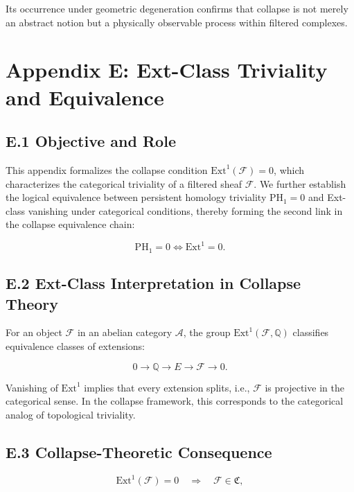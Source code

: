 \documentclass[11pt]{article}
\begin{document}
Its occurrence under geometric degeneration confirms that collapse is not merely an abstract notion but a physically observable process within filtered complexes.



\appendix
\section*{Appendix E: Ext-Class Triviality and Equivalence}

\subsection*{E.1 Objective and Role}

This appendix formalizes the collapse condition \( \mathrm{Ext}^1(\mathcal{F}) = 0 \), which characterizes the categorical triviality of a filtered sheaf \( \mathcal{F} \). We further establish the logical equivalence between persistent homology triviality \( \mathrm{PH}_1 = 0 \) and Ext-class vanishing under categorical conditions, thereby forming the second link in the collapse equivalence chain:

\[
\mathrm{PH}_1 = 0 \iff \mathrm{Ext}^1 = 0.
\]

\subsection*{E.2 Ext-Class Interpretation in Collapse Theory}

For an object \( \mathcal{F} \) in an abelian category \( \mathcal{A} \), the group \( \mathrm{Ext}^1(\mathcal{F}, \mathbb{Q}) \) classifies equivalence classes of extensions:

\[
0 \to \mathbb{Q} \to E \to \mathcal{F} \to 0.
\]

Vanishing of \( \mathrm{Ext}^1 \) implies that every extension splits, i.e., \( \mathcal{F} \) is projective in the categorical sense. In the collapse framework, this corresponds to the categorical analog of topological triviality.

\subsection*{E.3 Collapse-Theoretic Consequence}

\[
\mathrm{Ext}^1(\mathcal{F}) = 0 \quad \Rightarrow \quad \mathcal{F} \in \mathfrak{C},
\]
\end{document}

